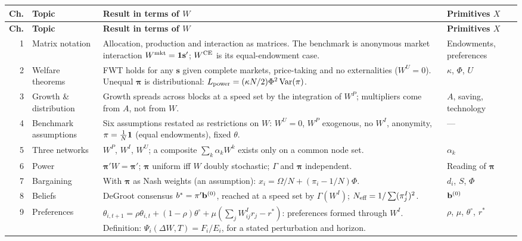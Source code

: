 \documentclass[../structural_economics_book.tex]{subfiles}
\begin{document}
{\small
\begin{longtable}{@{}r>{\raggedright\arraybackslash}p{2.5cm}>{\raggedright\arraybackslash}p{7.6cm}>{\raggedright\arraybackslash}p{3.1cm}@{}}
\toprule
\textbf{Ch.} & \textbf{Topic} & \textbf{Result in terms of $W$} & \textbf{Primitives $X$} \\
\midrule
\endfirsthead
\toprule
\textbf{Ch.} & \textbf{Topic} & \textbf{Result in terms of $W$} & \textbf{Primitives $X$} \\
\midrule
\endhead
1 & Matrix notation & Allocation, production and interaction as matrices. The benchmark is anonymous market interaction $W^{\text{mkt}} = \mathbf{1}\mathbf{s}'$; $W^{\text{CE}}$ is its equal-endowment case. & Endowments, preferences \\
2 & Welfare theorems & FWT holds for any $\mathbf{s}$ given complete markets, price-taking and no externalities ($W^U = 0$). Unequal $\boldsymbol{\pi}$ is distributional: $L_{\text{power}} = (\kappa N/2)\Phi^2\operatorname{Var}(\pi)$. & $\kappa$, $\Phi$, $U$ \\
3 & Growth \& distribution & Growth spreads across blocks at a speed set by the integration of $W^P$; multipliers come from $A$, not from $W$. & $A$, saving, technology \\
4 & Benchmark assumptions & Six assumptions restated as restrictions on $W$: $W^U = 0$, $W^P$ exogenous, no $W^I$, anonymity, $\pi = \frac{1}{N}\mathbf{1}$ (equal endowments), fixed $\theta$. & --- \\
5 & Three networks & $W^P$, $W^I$, $W^U$; a composite $\sum_k \alpha_k W^k$ exists only on a common node set. & $\alpha_k$ \\
6 & Power & $\boldsymbol{\pi}' W = \boldsymbol{\pi}'$; $\boldsymbol{\pi}$ uniform iff $W$ doubly stochastic; $\Gamma$ and $\boldsymbol{\pi}$ independent. & Reading of $\boldsymbol{\pi}$ \\
7 & Bargaining & With $\boldsymbol{\pi}$ as Nash weights (an assumption): $x_i = \Omega/N + (\pi_i - 1/N)\Phi$. & $d_i$, $S$, $\Phi$ \\
8 & Beliefs & DeGroot consensus $b^* = \pi'\mathbf{b}^{(0)}$, reached at a speed set by $\Gamma(W^I)$; $N_{\text{eff}} = 1/\sum(\pi_j^I)^2$. & $\mathbf{b}^{(0)}$ \\
9 & Preferences & $\theta_{i,t+1} = \rho\theta_{i,t} + (1-\rho)\theta^{\circ} + \mu(\sum_j W^I_{ij}r_j - r^*)$: preferences formed through $W^I$. Definition: $\Psi_i(\Delta W, T) = F_i/E_i$, for a stated perturbation and horizon. & $\rho$, $\mu$, $\theta^{\circ}$, $r^*$ \\

\end{longtable}}
\end{document}
